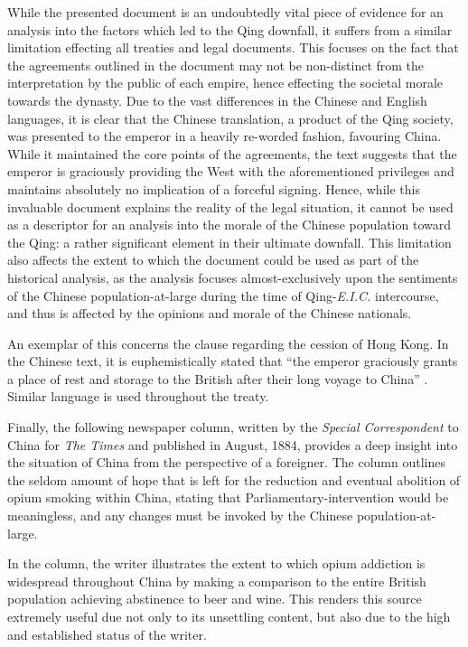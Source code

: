 \documentclass[a4paper,oneside]{article}
\begin{document}
While the presented document is an undoubtedly vital piece of evidence for an
analysis into the factors which led to the Qing downfall, it suffers from a
similar limitation effecting all treaties and legal documents. This focuses on
the fact that the agreements outlined in the document may not be non-distinct
from the interpretation by the public of each empire, hence effecting the
societal morale towards the dynasty.  Due to the vast differences in the Chinese
and English languages, it is clear that the Chinese translation, a product of
the Qing society, was presented to the emperor in a heavily re-worded fashion,
favouring China. While it maintained the core points of the agreements, the text
suggests that the emperor is graciously providing the West with the
aforementioned privileges and maintains absolutely no implication of a forceful
signing. Hence, while this invaluable document explains the reality of the legal
situation, it cannot be used as a descriptor for an analysis into the morale of
the Chinese population toward the Qing: a rather significant element in their
ultimate downfall. This limitation also affects the extent to which the document
could be used as part of the historical analysis, as the analysis focuses
almost-exclusively upon the sentiments of the Chinese population-at-large during
the time of Qing-\textit{E.I.C.} intercourse, and thus is affected by the
opinions and morale of the Chinese nationals.

An exemplar of this concerns the clause regarding the cession of Hong Kong. In
the Chinese text, it is euphemistically stated that ``the emperor graciously
grants a place of rest and storage to the British after their long voyage to
China'' \autocite{Zhang:2007}. Similar language is used throughout the treaty.

Finally, the following newspaper column, written by the \textit{Special
Correspondent} to China for \textit{The Times} and published in August, 1884,
provides a deep insight into the situation of China from the perspective of a
foreigner. The column outlines the seldom amount of hope that is left for the
reduction and eventual abolition of opium smoking within China, stating that
Parliamentary-intervention would be meaningless, and any changes must be invoked
by the Chinese population-at-large.


In the column, the writer illustrates the extent to which opium addiction is
widespread throughout China by making a comparison to the entire British
population achieving abstinence to beer and wine. This renders this source
extremely useful due not only to its unsettling content, but also due to the
high and established status of the writer.
\end{document}
